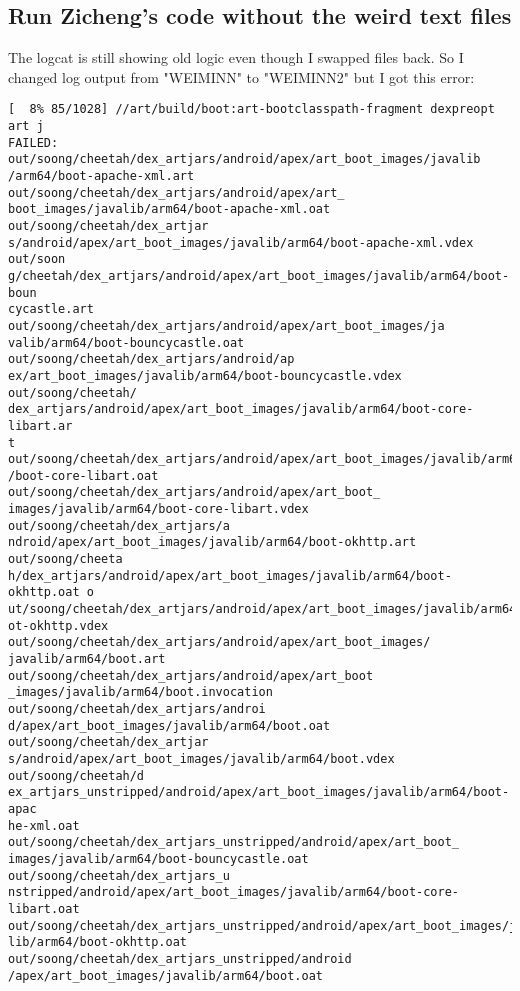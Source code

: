 \subsection{Run Zicheng's code without the weird text files}
\label{task:20240505_android}

The logcat is still showing old logic even though I swapped files back. So I changed log output from "WEIMINN" to "WEIMINN2" but I got this error:
\begin{lstlisting}
[  8% 85/1028] //art/build/boot:art-bootclasspath-fragment dexpreopt art j
FAILED: out/soong/cheetah/dex_artjars/android/apex/art_boot_images/javalib
/arm64/boot-apache-xml.art out/soong/cheetah/dex_artjars/android/apex/art_
boot_images/javalib/arm64/boot-apache-xml.oat out/soong/cheetah/dex_artjar
s/android/apex/art_boot_images/javalib/arm64/boot-apache-xml.vdex out/soon
g/cheetah/dex_artjars/android/apex/art_boot_images/javalib/arm64/boot-boun
cycastle.art out/soong/cheetah/dex_artjars/android/apex/art_boot_images/ja
valib/arm64/boot-bouncycastle.oat out/soong/cheetah/dex_artjars/android/ap
ex/art_boot_images/javalib/arm64/boot-bouncycastle.vdex out/soong/cheetah/
dex_artjars/android/apex/art_boot_images/javalib/arm64/boot-core-libart.ar
t out/soong/cheetah/dex_artjars/android/apex/art_boot_images/javalib/arm64
/boot-core-libart.oat out/soong/cheetah/dex_artjars/android/apex/art_boot_
images/javalib/arm64/boot-core-libart.vdex out/soong/cheetah/dex_artjars/a
ndroid/apex/art_boot_images/javalib/arm64/boot-okhttp.art out/soong/cheeta
h/dex_artjars/android/apex/art_boot_images/javalib/arm64/boot-okhttp.oat o
ut/soong/cheetah/dex_artjars/android/apex/art_boot_images/javalib/arm64/bo
ot-okhttp.vdex out/soong/cheetah/dex_artjars/android/apex/art_boot_images/
javalib/arm64/boot.art out/soong/cheetah/dex_artjars/android/apex/art_boot
_images/javalib/arm64/boot.invocation out/soong/cheetah/dex_artjars/androi
d/apex/art_boot_images/javalib/arm64/boot.oat out/soong/cheetah/dex_artjar
s/android/apex/art_boot_images/javalib/arm64/boot.vdex out/soong/cheetah/d
ex_artjars_unstripped/android/apex/art_boot_images/javalib/arm64/boot-apac
he-xml.oat out/soong/cheetah/dex_artjars_unstripped/android/apex/art_boot_
images/javalib/arm64/boot-bouncycastle.oat out/soong/cheetah/dex_artjars_u
nstripped/android/apex/art_boot_images/javalib/arm64/boot-core-libart.oat 
out/soong/cheetah/dex_artjars_unstripped/android/apex/art_boot_images/java
lib/arm64/boot-okhttp.oat out/soong/cheetah/dex_artjars_unstripped/android
/apex/art_boot_images/javalib/arm64/boot.oat

\end{lstlisting}
